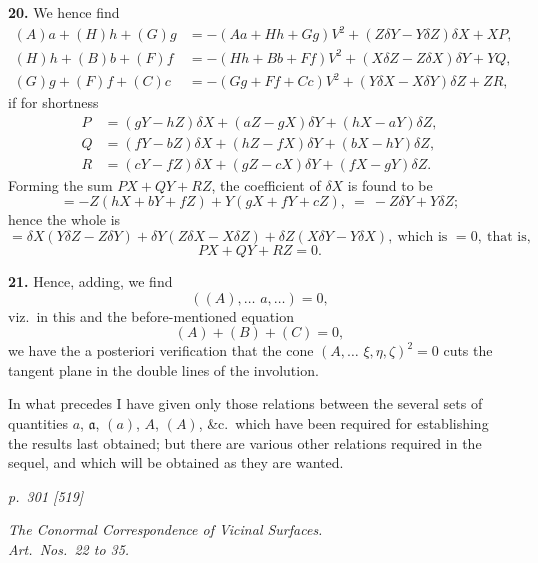 \documentclass[11pt,a4paper]{article}
\theoremstyle{plain}
\begin{document}
\textbf{20.} We hence find
\begin{align*}
(A)a + (H)h + (G)g &= -(Aa + Hh + Gg)V^2 + (Z\delta Y - Y\delta Z)\delta X + XP, \\
(H)h + (B)b + (F)f &= -(Hh + Bb + Ff)V^2 + (X\delta Z - Z\delta X)\delta Y + YQ, \\
(G)g + (F)f + (C)c &= -(Gg + Ff + Cc)V^2 + (Y\delta X - X\delta Y)\delta Z + ZR,
\end{align*}
if for shortness
\begin{align*}
P &= (gY - hZ)\delta X + (aZ - gX)\delta Y + (hX - aY)\delta Z, \\
Q &= (fY - bZ)\delta X + (hZ - fX)\delta Y + (bX - hY)\delta Z, \\
R &= (cY - fZ)\delta X + (gZ - cX)\delta Y + (fX - gY)\delta Z.
\end{align*}
Forming the sum $PX + QY + RZ$, the coefficient of $\delta X$ is found to be
\[
= -Z(hX + bY + fZ) + Y(gX + fY + cZ),\ =\ -Z\delta Y + Y\delta Z;
\]
hence the whole is
\[
= \delta X(Y\delta Z - Z\delta Y) + \delta Y(Z\delta X - X\delta Z) + \delta Z(X\delta Y - Y\delta X),\ \text{which is } = 0,\ \text{that is,}
\]
\[
PX + QY + RZ = 0.
\]

\textbf{21.} Hence, adding, we find
\[
((A), \ldots\,\,a, \ldots) = 0,
\]
viz.\ in this and the before-mentioned equation
\[
(A) + (B) + (C) = 0,
\]
we have the a posteriori verification that the cone $(A, \ldots\,\,\xi, \eta, \zeta)^2 = 0$ cuts the tangent
plane in the double lines of the involution.

In what precedes I have given only those relations between the several sets of
quantities $a$, $\mathfrak{a}$, $(a)$, $A$, $(A)$, \&c.\ which have been required for establishing the results
last obtained; but there are various other relations required in the sequel, and which
will be obtained as they are wanted.

\bigskip
\textit{p.~301 [519]}
\smallskip

\begin{center}\textit{The Conormal Correspondence of Vicinal Surfaces. \\ Art.\ Nos.\ 22 to 35.}\end{center}
\end{document}
